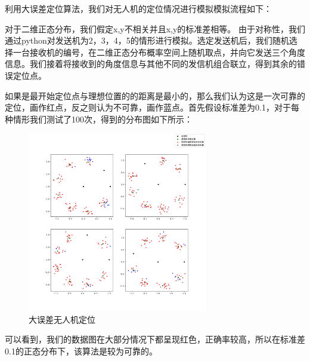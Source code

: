 \documentclass{my_paper}
\begin{document}
利用大误差定位算法，我们对无人机的定位情况进行模拟模拟流程如下：

对于二维正态分布，我们假定x,y不相关并且x,y的标准差相等。
由于对称性，我们通过python对发送机为2，3，4，5的情形进行模拟。选定发送机后，我们随机选择一台接收机的编号，在二维正态分布概率空间上随机取点，并向它发送三个角度信息。我们接着将接收到的角度信息与其他不同的发信机组合联立，得到其余的错误定位点。

如果是最开始定位点与理想位置的的距离是最小的，那么我们认为这是一次可靠的定位，画作红点，反之则认为不可靠，画作蓝点。首先假设标准差为0.1，对于每种情形我们测试了100次，得到的分布图如下所示：

\begin{figure}[H]
    \centering
    \includegraphics[width=0.7\textwidth]{two0}
    \caption{大误差无人机定位} 
\end{figure}

可以看到，我们的数据图在大部分情况下都呈现红色，正确率较高，所以在标准差0.1的正态分布下，该算法是较为可靠的。
\end{document}
